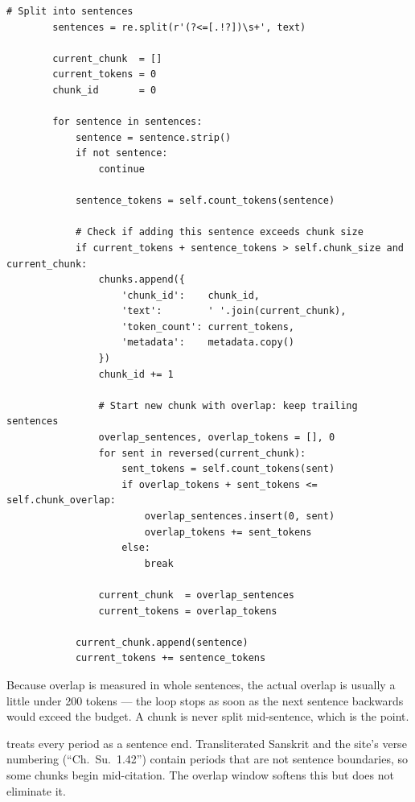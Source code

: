 \begin{lstlisting}[style=py,firstnumber=134]
        # Split into sentences
        sentences = re.split(r'(?<=[.!?])\s+', text)

        current_chunk  = []
        current_tokens = 0
        chunk_id       = 0

        for sentence in sentences:
            sentence = sentence.strip()
            if not sentence:
                continue

            sentence_tokens = self.count_tokens(sentence)

            # Check if adding this sentence exceeds chunk size
            if current_tokens + sentence_tokens > self.chunk_size and current_chunk:
                chunks.append({
                    'chunk_id':    chunk_id,
                    'text':        ' '.join(current_chunk),
                    'token_count': current_tokens,
                    'metadata':    metadata.copy()
                })
                chunk_id += 1

                # Start new chunk with overlap: keep trailing sentences
                overlap_sentences, overlap_tokens = [], 0
                for sent in reversed(current_chunk):
                    sent_tokens = self.count_tokens(sent)
                    if overlap_tokens + sent_tokens <= self.chunk_overlap:
                        overlap_sentences.insert(0, sent)
                        overlap_tokens += sent_tokens
                    else:
                        break

                current_chunk  = overlap_sentences
                current_tokens = overlap_tokens

            current_chunk.append(sentence)
            current_tokens += sentence_tokens
\end{lstlisting}

Because overlap is measured in whole sentences, the actual overlap is usually a little under 200 tokens --- the loop stops as soon as the next sentence backwards would exceed the budget. A chunk is never split mid-sentence, which is the point.

\begin{warn}[title={The sentence splitter and Sanskrit transliteration}]
 treats every period as a sentence end. Transliterated Sanskrit and the site's verse numbering (``Ch.~Su.~1.42'') contain periods that are not sentence boundaries, so some chunks begin mid-citation. The overlap window softens this but does not eliminate it.
\end{warn}

